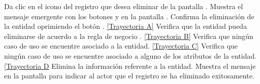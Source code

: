 	\begin{UCtrayectoria}
		\UCpaso[\UCactor] Da clic en el icono \eliminar del registro que desea eliminar de la pantalla .
		\UCpaso[\UCsist] Muestra el mensaje emergente  con los botones  y  en la pantalla .
		\UCpaso[\UCactor] Confirma la eliminación de la entidad oprimiendo el botón . \hyperlink{CU7-3:TAA}{[Trayectoria A]}
		\UCpaso[\UCsist] Verifica que la entidad pueda eliminarse de acuerdo a la regla de negocio . \hyperlink{CU7-3:TAB}{[Trayectoria B]}
		\UCpaso[\UCsist] Verifica que ningún caso de uso se encuentre asociado a la entidad. \hyperlink{CU7-3:TAC}{[Trayectoria C]}
		\UCpaso[\UCsist] Verifica que ningún caso de uso se encuentre asociado a alguno de los atributos de la entidad. \hyperlink{CU7-3:TAD}{[Trayectoria D}
		\UCpaso[\UCsist] Elimina la información referente a la entidad.
		\UCpaso[\UCsist] Muestra el mensaje  en la pantalla  para indicar al actor que el registro se ha eliminado exitosamente.
	\end{UCtrayectoria}

